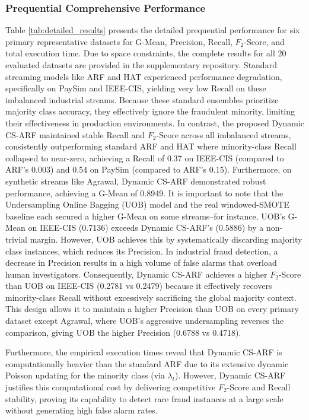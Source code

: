 \documentclass[review,12pt]{elsarticle}
\begin{document}
\subsubsection{Prequential Comprehensive Performance}
Table \ref{tab:detailed_results} presents the detailed prequential performance for six primary representative datasets for G-Mean, Precision, Recall, $F_2$-Score, and total execution time. Due to space constraints, the complete results for all 20 evaluated datasets are provided in the supplementary repository. Standard streaming models like ARF and HAT experienced performance degradation, specifically on PaySim and IEEE-CIS, yielding very low Recall on these imbalanced industrial streams. Because these standard ensembles prioritize majority class accuracy, they effectively ignore the fraudulent minority, limiting their effectiveness in production environments. In contrast, the proposed Dynamic CS-ARF maintained stable Recall and $F_2$-Score across all imbalanced streams, consistently outperforming standard ARF and HAT where minority-class Recall collapsed to near-zero, achieving a Recall of 0.37 on IEEE-CIS (compared to ARF's 0.003) and 0.54 on PaySim (compared to ARF's 0.15). Furthermore, on synthetic streams like Agrawal, Dynamic CS-ARF demonstrated robust performance, achieving a G-Mean of 0.8949. It is important to note that the Undersampling Online Bagging (UOB) model and the real windowed-SMOTE baseline each secured a higher G-Mean on some streams--for instance, UOB's G-Mean on IEEE-CIS (0.7136) exceeds Dynamic CS-ARF's (0.5886) by a non-trivial margin. However, UOB achieves this by systematically discarding majority class instances, which reduces its Precision. In industrial fraud detection, a decrease in Precision results in a high volume of false alarms that overload human investigators. Consequently, Dynamic CS-ARF achieves a higher $F_2$-Score than UOB on IEEE-CIS (0.2781 vs 0.2479) because it effectively recovers minority-class Recall without excessively sacrificing the global majority context. This design allows it to maintain a higher Precision than UOB on every primary dataset except Agrawal, where UOB's aggressive undersampling reverses the comparison, giving UOB the higher Precision (0.6788 vs 0.4718).

Furthermore, the empirical execution times reveal that Dynamic CS-ARF is computationally heavier than the standard ARF due to its extensive dynamic Poisson updating for the minority class (via $\lambda_t$). However, Dynamic CS-ARF justifies this computational cost by delivering competitive $F_2$-Score and Recall stability, proving its capability to detect rare fraud instances at a large scale without generating high false alarm rates.
\end{document}
